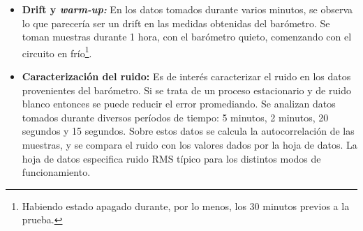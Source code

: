 \documentclass[main]{subfiles}
\begin{document}
\begin{itemize}
\item \label{sec:drift-y-warm-up} \textbf{Drift y \textit{warm-up:}} En los datos tomados durante varios minutos, se observa lo que parecer\'ia ser un drift en las medidas obtenidas del bar\'ometro. Se toman muestras durante 1 hora, con el bar\'ometro quieto, comenzando con el circuito en fr\'io\footnote{Habiendo estado apagado durante, por lo menos, los 30 minutos previos a la prueba.}.

\item \textbf{Caracterizaci\'on del ruido:} Es de inter\'es caracterizar el ruido en los datos provenientes del bar\'ometro. Si se trata de un proceso estacionario y de ruido blanco entonces se puede reducir el error promediando. Se analizan datos tomados durante diversos per\'iodos de tiempo: 5 minutos, 2 minutos, 20 segundos y 15 segundos. Sobre estos datos se calcula la autocorrelaci\'on de las muestras, y se compara el ruido con los valores dados por la hoja de datos. La hoja de datos especifica ruido RMS t\'ipico para los distintos modos de funcionamiento.

  \begin{figure}[h!]
    \vspace{-20pt}
    \begin{center}
    \end{center}
    \vspace{-20pt}
    \caption{}
    \vspace{-20pt}
    \label{fig:escalera-fing}
  \end{figure}


\end{itemize}
\end{document}
